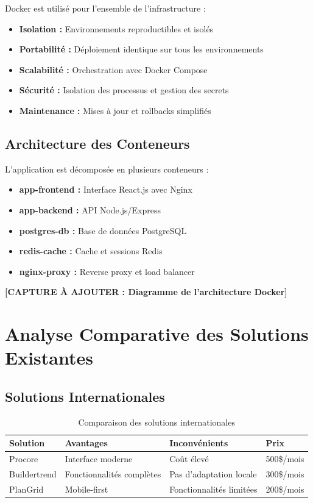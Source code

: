 Docker est utilisé pour l'ensemble de l'infrastructure :

\begin{itemize}
    \item \textbf{Isolation :} Environnements reproductibles et isolés
    \item \textbf{Portabilité :} Déploiement identique sur tous les environnements
    \item \textbf{Scalabilité :} Orchestration avec Docker Compose
    \item \textbf{Sécurité :} Isolation des processus et gestion des secrets
    \item \textbf{Maintenance :} Mises à jour et rollbacks simplifiés
\end{itemize}

\subsection{Architecture des Conteneurs}

L'application est décomposée en plusieurs conteneurs :

\begin{itemize}
    \item \textbf{app-frontend :} Interface React.js avec Nginx
    \item \textbf{app-backend :} API Node.js/Express
    \item \textbf{postgres-db :} Base de données PostgreSQL
    \item \textbf{redis-cache :} Cache et sessions Redis
    \item \textbf{nginx-proxy :} Reverse proxy et load balancer
\end{itemize}

\textbf{[CAPTURE À AJOUTER : Diagramme de l'architecture Docker]}

\section{Analyse Comparative des Solutions Existantes}

\subsection{Solutions Internationales}

\begin{table}[h]
\centering
\begin{tabular}{|l|l|l|l|}
\hline
\textbf{Solution} & \textbf{Avantages} & \textbf{Inconvénients} & \textbf{Prix} \\
\hline
Procore & Interface moderne & Coût élevé & 500\$/mois \\
\hline
Buildertrend & Fonctionnalités complètes & Pas d'adaptation locale & 300\$/mois \\
\hline
PlanGrid & Mobile-first & Fonctionnalités limitées & 200\$/mois \\
\hline
\end{tabular}
\caption{Comparaison des solutions internationales}
\end{table}

